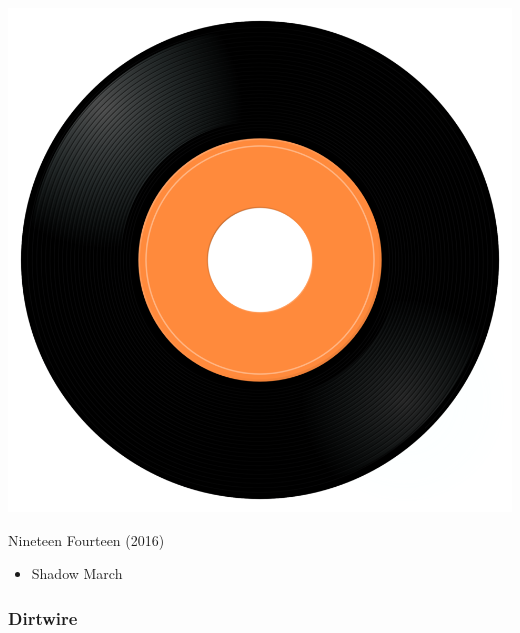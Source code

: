 \begin{minipage}[t]{0.25\textwidth}
\captionsetup{type=figure}
\includegraphics[width=\textwidth]{Images/cover.png}
\caption*{Nineteen Fourteen (2016)}
\end{minipage}
\begin{minipage}[t]{0.25\textwidth}\vspace{0pt}
\begin{itemize}[nosep,leftmargin=1em,labelwidth=*,align=left]
	\setlength{\itemsep}{0pt}
	\item Shadow March
\end{itemize}
\end{minipage}

\subsubsection{Dirtwire}

